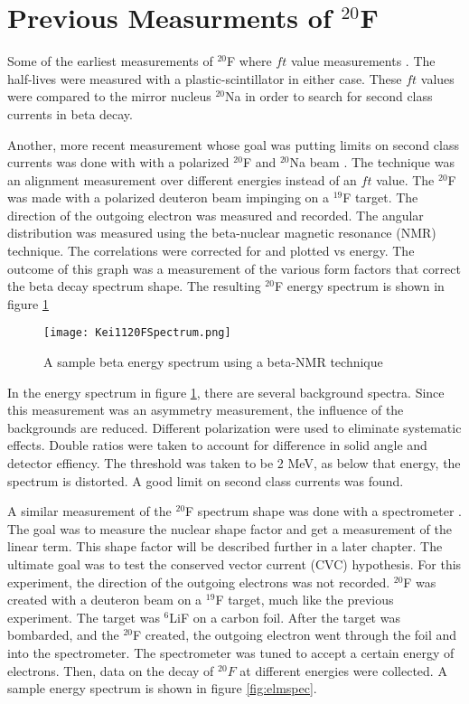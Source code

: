\documentclass[main.tex]{subfiles}
\begin{document}
\section{Previous Measurments of $^{20}$F}

Some of the earliest measurements of $^{20}$F where $ft$ value measurements \cite{Wil70} \cite{Alb75}.
The half-lives were measured with a plastic-scintillator in either case.  
These $ft$ values were compared to the mirror nucleus $^{20}$Na in order to search for second class currents in beta decay. 

Another, more recent measurement whose goal was putting limits on second class currents was done with with a polarized $^{20}$F and $^{20}$Na beam \cite{Min11}.
The technique was an alignment measurement over different energies instead of an $ft$ value. 
The $^{20}$F was made with a polarized deuteron beam impinging on a $^{19}$F target. 
The direction of the outgoing electron was measured and recorded.
The angular distribution was measured using the beta-nuclear magnetic resonance (NMR) technique.
The correlations were corrected for and plotted vs energy.
The outcome of this graph was a measurement of the various form factors that correct the beta decay spectrum shape. 
The resulting $^{20}$F energy spectrum is shown in figure \ref{fig:keispec}

\begin{figure}[!htb]
	\centerline{\texttt{[image: Kei1120FSpectrum.png]}}
	\caption{A sample beta energy spectrum using a beta-NMR technique \cite{Min11}}
	\label{fig:keispec}
\end{figure}

In the energy spectrum in figure \ref{fig:keispec}, there are several background spectra. 
Since this measurement  was an asymmetry measurement, the influence of the backgrounds are reduced. 
Different polarization were used to eliminate systematic effects.
Double ratios were taken to account for difference in solid angle and detector effiency.
The threshold was taken to be 2 MeV, as below that energy, the spectrum is distorted.
A good limit on second class currents was found.

A similar measurement of the $^{20}$F spectrum shape was done with a spectrometer \cite{Elm87}.
The goal was to measure the nuclear shape factor and get a measurement of the linear term.
This shape factor will be described further in a later chapter.
The ultimate goal was to test the conserved vector current (CVC) hypothesis. 
For this experiment, the direction of the outgoing electrons was not recorded.
$^{20}$F was created with a deuteron beam on a $^{19}$F target, much like the previous experiment.
The target was $^{6}$LiF on a carbon foil.
After the target was bombarded, and the $^{20}$F created, the outgoing electron went through the foil and into the spectrometer.
The spectrometer was tuned to accept a certain energy of electrons. 
Then, data on the decay of $^{20}F$ at different energies were collected.
A sample energy spectrum is shown in figure \ref{fig:elmspec}.
\end{document}
